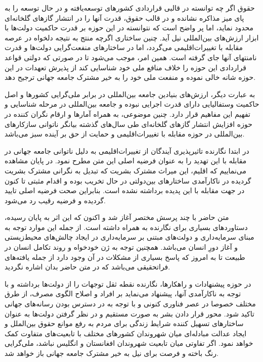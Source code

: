  حقوق اگر چه توانسته در قالبی قراردادی کشور‌های توسعه‌یافته و در حال توسعه را به پای میز مذاکره نشانده و در قالب حقوق، قدرت آنها را در انتشار گاز‌های گلخانه‌ای محدود نماید، اما پر واضح است که نتوانسته در این حوزه بر قدرت حاکمیت دولت‌ها با ابزار ارزش‌های بین‌المللی نیل آید. چنین ساختاری اگرچه منتج به نتیجه دلخواه در عرصه مقابله با تغییرات‌اقلیمی می‌گردد، اما در ساختار‌های منفعت‌گرایی دولت‌ها و قدرت نامنتهای آنها جای گرفته است. همین امر، موجب می‌شود تا در صورتی که دولتی قواعد قراردادی این حوزه را خلاف منافع ملی خود شناسایی کند از پذیرش تعهدات در این حوزه شانه خالی نموده و منفعت ملی خود را به خیر مشترک جامعه جهانی ترجیح دهد. 
 
 به عبارت دیگر، ارزش‌های بنیادین جامعه بین‌المللی در برابر ملی‌گرایی کشور‌ها و اصل حاکمیت وستفالیایی دارای قدرت اجرایی نبوده و جامعه بین‌المللی در مرحله شناسایی و تفهیم این مفاهیم قرار دارد. چنین موضوعی، به همراه آمارها و ارقام نگران کننده در حوزه افزایش انتشار گاز‌های گلخانه‌ای طی سال‌های گذشته بیانگر ناتوانی سازکار‌های بین‌المللی در حوزه مقابله با تغییرات‌اقلیمی و حمایت از حق بر آینده سبز می‌باشد.
 
 
 
 
در ابتدا نگارنده تاثیرپذیری آیندگان از تغییرات‌اقلیمی به دلیل ناتوانی جامعه جهانی در مقابله با این تهدید را به عنوان  فرضیه اصلی این متن مطرح نمود. در پایان مشاهده می‌نماییم که اقلیم، این میراث مشترک بشریت که تبدیل به نگرانی مشترک بشریت گردیده در ناکارآمدی ساختار‌های بین‌دولتی در حال تخریب بوده و اقدام مثبتی تا کنون در جهت مقابله با این پدیده برداشته نشده است. بنابراین صحت فرضیه اصلی تایید گردیده و فرضیه رقیب رد می‌شود. 
 
 
متن حاضر با چند پرسش مختصر آغاز شد و اکنون که این اثر به پایان رسیده، دستاورد‌های بسیاری برای نگارنده به همراه داشته است. از جمله این موارد توجه به مبنای سرمایه‌داری و دولت‌های مبتنی بر سرمایه‌داری در ایجاد چالش‌های  محیط‌زیستی و آغاز دورِ انسان می‌باشد. همچنین توجه به ژن خودخواه و روند تکامل انسان در طبیعت تا به امروز که پاسخ بسیاری از مشکلات در آن وجود دارد از جمله یافته‌های فراتحقیقی می‌باشد که در متن حاضر بدان اشاره نگردید.  


در حوزه پیشنهادات و راهکار‌ها، نگارنده نقطه ثقل توجهات را از دولت‌ها برداشته و با توجه به ناکارآمدی آنها، پیشنهاد می‌نماید بر افراد و اصلاح الگوی مصرف، از طرق مختلف خصوصا در عصر فناوری کنونی و با توجه به در دسترس بودن رسانه‌های جهانی تاکید شود. محور قرار دادن بشر به صورت مستقیم و در نظر گرفتن دولت‌ها به عنوان ساختار‌های تسهیل کننده شرایط زندگی برای مردم به رفع موانع حقوق بین‌الملل و ایجاد عدالت مبادله‌ای میان شهروندان کشور‌های مختلف با تابعیت‌های متفاوت کمک خواهد نمود. اگر تفاوتی میان تابعیت شهروندان افغانستان و انگلیس نباشد، ملی‌گرایی رنگ باخته و فرصت برای نیل به خیر مشترک جامعه جهانی باز خواهد شد. 

